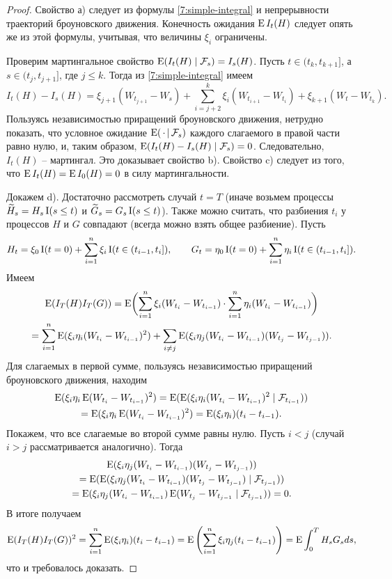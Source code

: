\begin{proof}
Свойство а) следует из формулы \eqref{7:simple-integral} и непрерывности траекторий броуновского движения.
Конечность ожидания $\operatorname{E} I_t(H)$ следует опять же из этой формулы, учитывая, что величины $\xi_i$ ограничены.

Проверим мартингальное свойство $\operatorname{E}(I_t(H) \mid \mathcal{F}_s) = I_s(H)$.
Пусть $t\in (t_k,t_{k+1}]$, а $s\in (t_j, t_{j+1}]$, где $j\le k$.
Тогда из \eqref{7:simple-integral} имеем
\[
I_t(H) - I_s(H) = \xi_{j+1}(W_{t_{j+1}} - W_s) + \sum_{i=j+2}^k \xi_i(W_{t_{i+1}} - W_{t_i}) + \xi_{k+1}(W_t - W_{t_k}). 
\]
Пользуясь независимостью приращений броуновского движения, нетрудно показать, что условное ожидание $\operatorname{E}(\,\cdot\,|\, \mathcal{F}_s)$ каждого слагаемого в правой части равно нулю, и, таким образом, $\operatorname{E}(I_t(H) -I_s(H) \mid \mathcal{F}_s) = 0$.
Следовательно, $I_t(H)$ -- мартингал.
Это доказывает свойство b).
Свойство c) следует из того, что $\operatorname{E} I_t(H) = \operatorname{E} I_0(H) = 0$ в силу мартингальности.

Докажем d).
Достаточно рассмотреть случай $t=T$ (иначе возьмем процессы $\widetilde H_s = H_s \operatorname{I}(s\le t)$ и $\widetilde G_s = G_s \operatorname{I}(s\le t)$).
Также можно считать, что разбиения $t_i$ у процессов $H$ и $G$ совпадают (всегда можно взять общее разбиение).
Пусть
\[
H_t = \xi_0 \operatorname{I}(t=0) + \sum_{i=1}^n \xi_i \operatorname{I}(t \in (t_{i-1}, t_i]), \qquad
G_t = \eta_0 \operatorname{I}(t=0) + \sum_{i=1}^n \eta_i \operatorname{I}(t \in (t_{i-1}, t_i]).
\]
Имеем
\begin{multline*}
\operatorname{E}(I_T(H)I_T(G)) 
= \operatorname{E}\biggl(\sum_{i=1}^n \xi_i (W_{t_i} - W_{t_{i-1}}) \cdot
  \sum_{i=1}^n \eta_i (W_{t_i} - W_{t_{i-1}})\biggr) \\
= \sum_{i=1}^n \operatorname{E}(\xi_i\eta_i (W_{t_i} - W_{t_{i-1}})^2)
+ \sum_{i\neq j} \operatorname{E}(\xi_i\eta_j (W_{t_i} - W_{t_{i-1}})(W_{t_j} - W_{t_{j-1}})).
\end{multline*}
Для слагаемых в первой сумме, пользуясь независимостью приращений броуновского движения, находим
\begin{multline*}
\operatorname{E}(\xi_i\eta_i \operatorname{E}(W_{t_i} - W_{t_{i-1}})^2)
= \operatorname{E}(\operatorname{E}(\xi_i\eta_i (W_{t_i} - W_{t_{i-1}})^2 \mid \mathcal{F}_{t_{i-1}})) \\
= \operatorname{E}(\xi_i\eta_i \operatorname{E}(W_{t_i} - W_{t_{i-1}})^2) = \operatorname{E}(\xi_i\eta_i) (t_i - t_{i-1}).
\end{multline*}
Покажем, что все слагаемые во второй сумме равны нулю. Пусть $i<j$ (случай $i>j$ рассматривается аналогично). Тогда
\begin{multline*}
\operatorname{E} (\xi_i\eta_j (W_{t_i} - W_{t_{i-1}})(W_{t_j} - W_{t_{j-1}})) \\
= \operatorname{E} (\operatorname{E}(\xi_i\eta_j (W_{t_i} - W_{t_{i-1}}) (W_{t_j} - W_{t_{j-1}}) 
  \mid \mathcal{F}_{t_{j-1}}))\\
= \operatorname{E} (\xi_i\eta_j (W_{t_i} - W_{t_{i-1}}) \operatorname{E}(W_{t_j} - W_{t_{j-1}} 
  \mid \mathcal{F}_{t_{j-1}})) 
= 0.
\end{multline*}
В итоге получаем
\[
\operatorname{E}(I_T(H)I_T(G))^2 = \sum_{i=1}^n\operatorname{E}( \xi_i\eta_i) (t_i -t_{i-1}) =
\operatorname{E}\left( \sum_{i=1}^n \xi_i\eta_j (t_i -t_{i-1})\right) 
= \operatorname{E} \int_0^T H_sG_s ds,
\]
что и требовалось доказать.
\end{proof}


